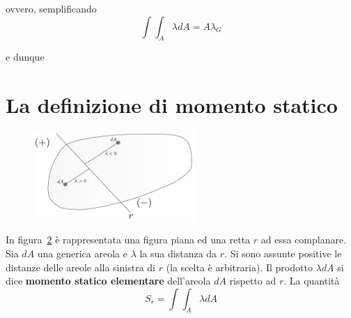 \noindent ovvero, semplificando 
\begin{equation*}
\int\int_A \lambda dA = A \lambda_G
\end{equation*}

\noindent e dunque 
\begin{figure}[h!] 
\centering
{}
\label{}
\end{figure}
\section{La definizione di momento statico}
\renewcommand{\thefigure}{1~-~2}
\begin{figure}[ht]
\centering
\includegraphics[width=0.55\textwidth]{Immagini/Parte_1/Figura1_2/Figura1_2.pdf}
\caption{}
\label{figura1-2}
\end{figure}
\noindent In figura~\ref{figura1-2} è rappresentata una figura piana ed una retta $r$ ad essa complanare. Sia $dA$ una generica areola e $\lambda$ la sua distanza da $r$. Si sono assunte positive le distanze delle areole alla sinistra di $r$ (la scelta è arbitraria). Il prodotto $\lambda dA$ si dice \textbf{momento statico elementare} dell'areola $dA$ rispetto ad $r$. La quantità 
\begin{equation} \label{equazione1-1}
\boxed{S_r=\int\int_A \lambda dA}
\tag{1.1}
\end{equation}

